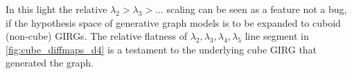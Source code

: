 In this light the relative $\lambda_2 > \lambda_3 > ...$ scaling can be seen as a feature not a bug, if the hypothesis space of generative graph models is to be expanded to cuboid (non-cube) GIRGs.
The relative flatness of $\lambda_2, \lambda_3, \lambda_4, \lambda_5$ line segment in \cref{fig:cube_diffmaps_d4} is a testament to the underlying cube GIRG that generated the graph.











